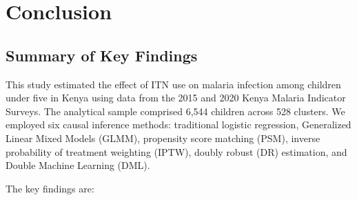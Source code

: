 \chapter{Conclusion}

\section{Summary of Key Findings}

This study estimated the effect of ITN use on malaria infection among children under five in Kenya using data from the 2015 and 2020 Kenya Malaria Indicator Surveys. The analytical sample comprised 6,544 children across 528 clusters. We employed six causal inference methods: traditional logistic regression, Generalized Linear Mixed Models (GLMM), propensity score matching (PSM), inverse probability of treatment weighting (IPTW), doubly robust (DR) estimation, and Double Machine Learning (DML).

The key findings are:

